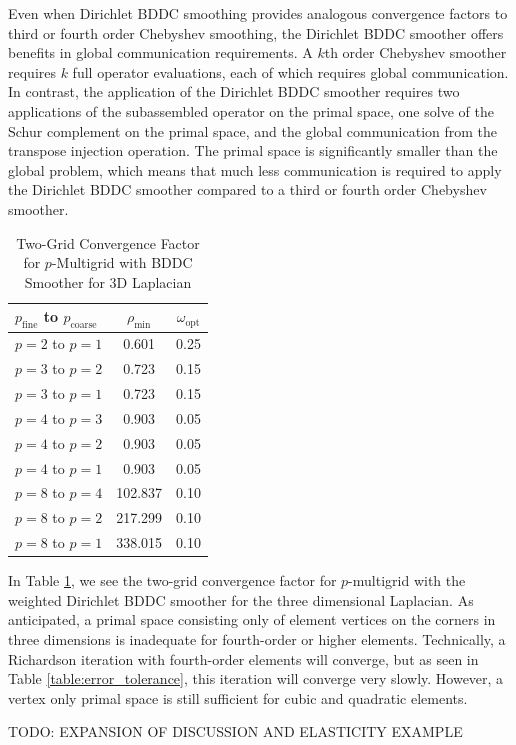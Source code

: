 Even when Dirichlet BDDC smoothing provides analogous convergence factors to third or fourth order Chebyshev smoothing, the Dirichlet BDDC smoother offers benefits in global communication requirements.
A $k$th order Chebyshev smoother requires $k$ full operator evaluations, each of which requires global communication.
In contrast, the application of the Dirichlet BDDC smoother requires two applications of the subassembled operator on the primal space, one solve of the Schur complement on the primal space, and the global communication from the transpose injection operation.
The primal space is significantly smaller than the global problem, which means that much less communication is required to apply the Dirichlet BDDC smoother compared to a third or fourth order Chebyshev smoother.

\begin{table}[ht!]
\begin{center}
\begin{tabular}{l cc}
  \toprule
  $p_{\text{fine}}$ to $p_{\text{coarse}}$  & $\rho_{\min}$ & $\omega_{\text{opt}}$  \\
  \toprule
  $p = 2$ to $p = 1$   &    0.601 & 0.25  \\
  \midrule
  $p = 3$ to $p = 2$   &    0.723 & 0.15  \\
  $p = 3$ to $p = 1$   &    0.723 & 0.15  \\
  \midrule
  $p = 4$ to $p = 3$   &    0.903 & 0.05  \\
  $p = 4$ to $p = 2$   &    0.903 & 0.05  \\
  $p = 4$ to $p = 1$   &    0.903 & 0.05  \\
  \midrule
  $p = 8$ to $p = 4$   &  102.837 & 0.10  \\
  $p = 8$ to $p = 2$   &  217.299 & 0.10  \\
  $p = 8$ to $p = 1$   &  338.015 & 0.10  \\
  \bottomrule
\end{tabular}
\end{center}
\caption{Two-Grid Convergence Factor for $p$-Multigrid with BDDC Smoother for 3D Laplacian}
\label{table:two_grid_bddc_smoother_3d}
\end{table}

In Table \ref{table:two_grid_bddc_smoother_3d}, we see the two-grid convergence factor for $p$-multigrid with the weighted Dirichlet BDDC smoother for the three dimensional Laplacian.
As anticipated, a primal space consisting only of element vertices on the corners in three dimensions is inadequate for fourth-order or higher elements.
Technically, a Richardson iteration with fourth-order elements will converge, but as seen in Table \ref{table:error_tolerance}, this iteration will converge very slowly.
However, a vertex only primal space is still sufficient for cubic and quadratic elements.

TODO: EXPANSION OF DISCUSSION AND ELASTICITY EXAMPLE
